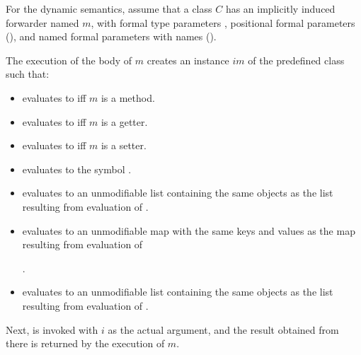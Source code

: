 \documentclass[makeidx]{article}
\begin{document}
\LMHash{}%
For the dynamic semantics,
assume that a class $C$ has an implicitly induced
 forwarder named $m$,
with formal type parameters
,
positional formal parameters
(),
and named formal parameters with names
().


\LMHash{}%
The execution of the body of $m$ creates
an instance $im$ of the predefined class 
such that:

\begin{itemize}
\item {} evaluates to \code{\TRUE{}} if{}f $m$ is a method.
\item {} evaluates to \code{\TRUE{}} if{}f $m$ is a getter.
\item {} evaluates to \code{\TRUE{}} if{}f $m$ is a setter.
\item {} evaluates to the symbol .
\item {} evaluates to an unmodifiable list
  containing the same objects as the list resulting from evaluation of
  .
\item {} evaluates to an unmodifiable map
  with the same keys and values as the map resulting from evaluation of

  .
\item {} evaluates to an unmodifiable list
  containing the same objects as the list resulting from evaluation of
  .
\end{itemize}

\LMHash{}%
Next,  is invoked with $i$ as the actual argument,
and the result obtained from there is returned by the execution of $m$.
\end{document}
